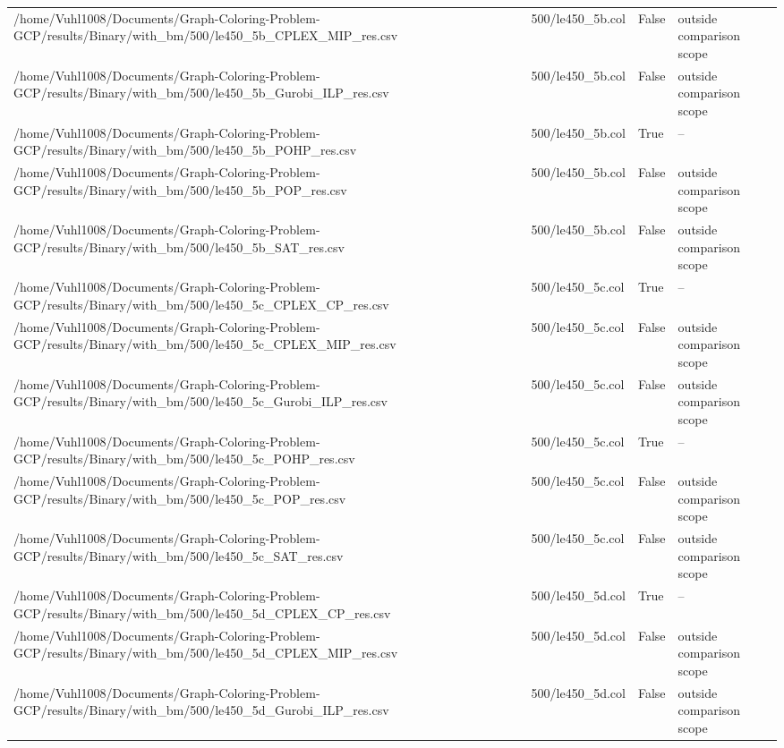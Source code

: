 \begin{table}[htbp]
\begin{tabular}{llll}
/home/Vuhl1008/Documents/Graph-Coloring-Problem-GCP/results/Binary/with\_bm/500/le450\_5b\_CPLEX\_MIP\_res.csv & 500/le450\_5b.col & False & outside comparison scope \\
/home/Vuhl1008/Documents/Graph-Coloring-Problem-GCP/results/Binary/with\_bm/500/le450\_5b\_Gurobi\_ILP\_res.csv & 500/le450\_5b.col & False & outside comparison scope \\
/home/Vuhl1008/Documents/Graph-Coloring-Problem-GCP/results/Binary/with\_bm/500/le450\_5b\_POHP\_res.csv & 500/le450\_5b.col & True & -- \\
/home/Vuhl1008/Documents/Graph-Coloring-Problem-GCP/results/Binary/with\_bm/500/le450\_5b\_POP\_res.csv & 500/le450\_5b.col & False & outside comparison scope \\
/home/Vuhl1008/Documents/Graph-Coloring-Problem-GCP/results/Binary/with\_bm/500/le450\_5b\_SAT\_res.csv & 500/le450\_5b.col & False & outside comparison scope \\
/home/Vuhl1008/Documents/Graph-Coloring-Problem-GCP/results/Binary/with\_bm/500/le450\_5c\_CPLEX\_CP\_res.csv & 500/le450\_5c.col & True & -- \\
/home/Vuhl1008/Documents/Graph-Coloring-Problem-GCP/results/Binary/with\_bm/500/le450\_5c\_CPLEX\_MIP\_res.csv & 500/le450\_5c.col & False & outside comparison scope \\
/home/Vuhl1008/Documents/Graph-Coloring-Problem-GCP/results/Binary/with\_bm/500/le450\_5c\_Gurobi\_ILP\_res.csv & 500/le450\_5c.col & False & outside comparison scope \\
/home/Vuhl1008/Documents/Graph-Coloring-Problem-GCP/results/Binary/with\_bm/500/le450\_5c\_POHP\_res.csv & 500/le450\_5c.col & True & -- \\
/home/Vuhl1008/Documents/Graph-Coloring-Problem-GCP/results/Binary/with\_bm/500/le450\_5c\_POP\_res.csv & 500/le450\_5c.col & False & outside comparison scope \\
/home/Vuhl1008/Documents/Graph-Coloring-Problem-GCP/results/Binary/with\_bm/500/le450\_5c\_SAT\_res.csv & 500/le450\_5c.col & False & outside comparison scope \\
/home/Vuhl1008/Documents/Graph-Coloring-Problem-GCP/results/Binary/with\_bm/500/le450\_5d\_CPLEX\_CP\_res.csv & 500/le450\_5d.col & True & -- \\
/home/Vuhl1008/Documents/Graph-Coloring-Problem-GCP/results/Binary/with\_bm/500/le450\_5d\_CPLEX\_MIP\_res.csv & 500/le450\_5d.col & False & outside comparison scope \\
/home/Vuhl1008/Documents/Graph-Coloring-Problem-GCP/results/Binary/with\_bm/500/le450\_5d\_Gurobi\_ILP\_res.csv & 500/le450\_5d.col & False & outside comparison scope \\

\end{tabular}
\end{table}
